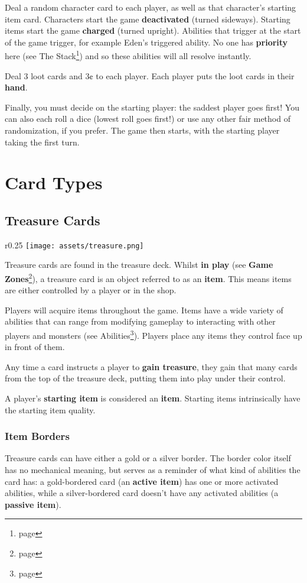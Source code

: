 \documentclass[10pt, a4paper, twoside]{article} %
\begin{document}
    Deal a random character card to each player, as well as that character’s starting item card. Characters start the game \textbf{deactivated} (turned sideways). Starting items start the game \textbf{charged} (turned upright). Abilities that trigger at the start of the game trigger, for example Eden’s triggered ability. No one has \textbf{priority} here (see The Stack\footnote{page \pageref{stack}}) and so these abilities will all resolve instantly.

    Deal 3 loot cards and 3¢ to each player. Each player puts the loot cards in their \textbf{hand}.

    Finally, you must decide on the starting player: the saddest player goes first! You can also each roll a dice (lowest roll goes first!) or use any other fair method of randomization, if you prefer. The game then starts, with the starting player taking the first turn.

    \section{Card Types}
    \label{types}
    \subsection{Treasure Cards}
    \begin{wrapfigure}{r}{0.25\textwidth}
        \centering
        \texttt{[image: assets/treasure.png]}
    \end{wrapfigure}
    Treasure cards are found in the treasure deck. Whilst \textbf{in play} (see \textbf{Game Zones}\footnote{page \pageref{zones}}), a treasure card is an object referred to as an \textbf{item}. This means items are either controlled by a player or in the shop.
  
    Players will acquire items throughout the game. Items have a wide variety of abilities that can range from modifying gameplay to interacting with other players and monsters (see Abilities\footnote{page \pageref{abilities}}). Players place any items they control face up in front of them.
  
    Any time a card instructs a player to \textbf{gain treasure}, they gain that many cards from the top of the treasure deck, putting them into play under their control.
  
    A player’s \textbf{starting item} is considered an \textbf{item}. Starting items intrinsically have the starting item quality.

    \subsubsection{Item Borders}
    Treasure cards can have either a gold or a silver border. The border color itself has no mechanical meaning, but serves as a reminder of what kind of abilities the card has: a gold-bordered card (an \textbf{active item}) has one or more activated abilities, while a silver-bordered card doesn’t have any activated abilities (a \textbf{passive item}).
\end{document}
